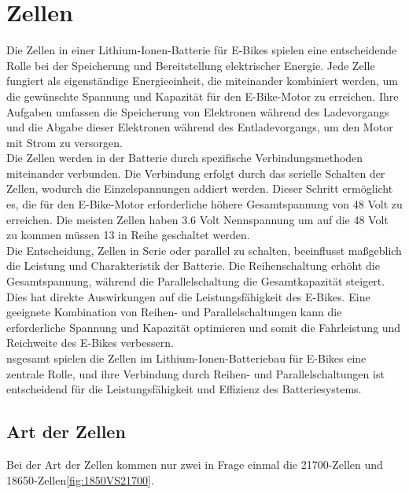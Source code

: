 \section{Zellen}
Die Zellen in einer Lithium-Ionen-Batterie für E-Bikes spielen eine entscheidende Rolle bei der Speicherung und Bereitstellung elektrischer Energie. Jede Zelle fungiert als eigenständige Energieeinheit, die miteinander kombiniert werden, um die gewünschte Spannung und Kapazität für den E-Bike-Motor zu erreichen. Ihre Aufgaben umfassen die Speicherung von Elektronen während des Ladevorgangs und die Abgabe dieser Elektronen während des Entladevorgangs, um den Motor mit Strom zu versorgen.\\

Die Zellen werden in der Batterie durch spezifische Verbindungsmethoden miteinander verbunden. Die Verbindung erfolgt durch das serielle Schalten der Zellen, wodurch die Einzelspannungen addiert werden. Dieser Schritt ermöglicht es, die für den E-Bike-Motor erforderliche höhere Gesamtspannung von 48 Volt zu erreichen. Die meisten Zellen haben 3.6 Volt Nennspannung um auf die 48 Volt zu kommen müssen 13 in Reihe geschaltet werden.\\

Die Entscheidung, Zellen in Serie oder parallel zu schalten, beeinflusst maßgeblich die Leistung und Charakteristik der Batterie. Die Reihenschaltung erhöht die Gesamtspannung, während die Parallelschaltung die Gesamtkapazität steigert. Dies hat direkte Auswirkungen auf die Leistungsfähigkeit des E-Bikes. Eine geeignete Kombination von Reihen- und Parallelschaltungen kann die erforderliche Spannung und Kapazität optimieren und somit die Fahrleistung und Reichweite des E-Bikes verbessern.\\

nsgesamt spielen die Zellen im Lithium-Ionen-Batteriebau für E-Bikes eine zentrale Rolle, und ihre Verbindung durch Reihen- und Parallelschaltungen ist entscheidend für die Leistungsfähigkeit und Effizienz des Batteriesystems.\\


\subsection{Art der Zellen}
Bei der Art der Zellen kommen nur zwei in Frage einmal die 21700-Zellen und 18650-Zellen\ref*{fig:1850VS21700}.

